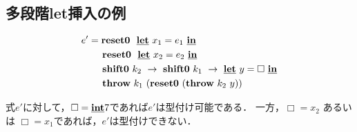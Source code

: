 \subsection{多段階let挿入の例}

\begin{align*}
  e' & = \textbf{reset0} ~~\underline{\textbf{let}}~x_1= e_1~\underline{\textbf{in}} \\
      & \phantom{=}~~ \textbf{reset0} ~~\underline{\textbf{let}}~x_2=e_2~\underline{\textbf{in}} \\
      & \phantom{=}~~ \textbf{shift0}~k_2~\to~ \textbf{shift0}~k_1~\to~ \underline{\textbf{let}}~y=\Box~\underline{\textbf{in}} \\
      & \phantom{=}~~ \textbf{throw}~k_1~ (\textbf{reset0}~ (\textbf{throw}~k_2~ y))
\end{align*}

式$e'$に対して，$\Box=\underline{\textbf{int}}7$であれば$e'$は型付け可能である．
一方，$\Box=x_2$ あるいは $\Box=x_1$であれば，$e'$は型付けできない．

\def\proofone{
  \infer
  {\vdash e':\tzero;~\cdot{}}
  {
    \infer{\vdash \cLet~x_1=e_1~\cIn~\Resetz~\cLet~x_2=e_2~\cIn~\cdots :
      \tzero;~\tzero
    }
    {\infer{\longer{\gamma_1}{\gamma_0},~x_1:\tone \vdash
        \Resetz~\cLet~x_2=e_2~\cIn~\cdots : \tone;~\tzero
      }
      {\prooftwo}
    }
  }
}
\def\prooftwo{
  \infer{\longer{\gamma_1}{\gamma_0},~x_1:\tone \vdash
    \cLet~x_2=e_2~\cIn~\cdots : \tone;~\tone,\tzero}
  {\infer{\Gamma_1=\longer{\gamma_2}{\gamma_1},~x_2:\ttwo,~\longer{\gamma_1}{\gamma_0},~x_1:\tone \vdash
      \shiftz{k_2}{\shiftz{k_1}{\cdots}} : \ttwo;~\tone,\tzero
    }
    {\proofthree}
  }
}

\def\proofthree{
  \infer{\Gamma_1,~k_2:\contT{\ttwo}{\tone}{\tzero}
    \vdash \shiftz{k_1}{\cdots} : \tone;~ \tzero
  }
  {\infer{\Gamma_2=\Gamma_1,~k_2:\contT{\ttwo}{\tone}{\tzero},
      ~k_1:\contT{\tone}{\tzero}{\cdot{}}
      \vdash \cLet~ y=\Box~ \cIn~\cdots : \tzero;~\cdot{}
    }
    {\prooffour}
  }
}

\def\prooffour{
  \infer{\Gamma_3=\Gamma_2,~\longer{\gamma_3}{\gamma_0},~y:\tthree \vdash \throw{k_1}{(\Resetz(\throw{k_2}{y}))} : \tthree;~\cdot{}}
  {\prooffive}
  & \infer[(*)]{\Gamma_2 \vdash \Box : \tzero;~ \cdot}{\vdots}
}


